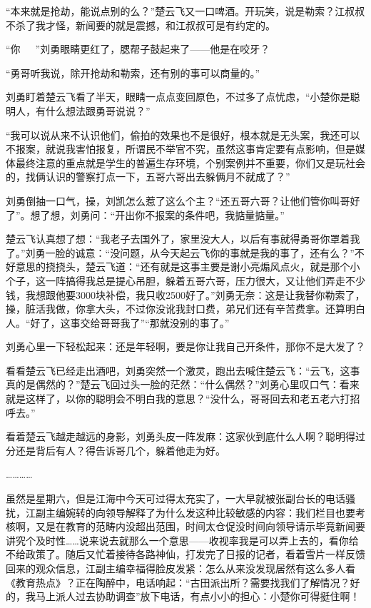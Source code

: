“本来就是抢劫，能说点别的么？”楚云飞又一口啤酒。开玩笑，说是勒索？江叔叔不杀了我才怪，新闻要的就是震撼，和江叔叔可是有约定的。

“你~~~”刘勇眼睛更红了，腮帮子鼓起来了——他是在咬牙？

“勇哥听我说，除开抢劫和勒索，还有别的事可以商量的。”

刘勇盯着楚云飞看了半天，眼睛一点点变回原色，不过多了点忧虑，“小楚你是聪明人，有什么想法跟勇哥说说？”

“我可以说从来不认识他们，偷拍的效果也不是很好，根本就是无头案，我还可以不报案，就说我害怕报复，所谓民不举官不究，虽然这事肯定要有点影响，但是媒体最终注意的重点就是学生的普遍生存环境，个别案例并不重要，你们又是玩社会的，找俩认识的警察打点一下，五哥六哥出去躲俩月不就成了？”

刘勇倒抽一口气，操，刘凯怎么惹了这么个主？“还五哥六哥？让他们管你叫哥好了”。想了想，刘勇问：“开出你不报案的条件吧，我掂量掂量。”

楚云飞认真想了想：“我老子去国外了，家里没大人，以后有事就得勇哥你罩着我了。”刘勇一脸的诚意：“没问题，从今天起云飞你的事就是我的事了，还有么？”不好意思的挠挠头，楚云飞道：“还有就是这事主要是谢小亮煽风点火，就是那个小个子，这一阵搞得我总是提心吊胆，躲着五哥六哥，压力很大，又让他们弄走不少钱，我想跟他要3000块补偿，我只收2500好了。”刘勇无奈：这是让我替你勒索了，操，脏活我做，你拿大头，不过你没讹我封口费，弟兄们还有辛苦费拿。还算明白人。“好了，这事交给哥哥我了”“那就没别的事了。”

刘勇心里一下轻松起来：还是年轻啊，要是你让我自己开条件，那你不是大发了？

看看楚云飞已经走出酒吧，刘勇突然一个激灵，跑出去喊住楚云飞：“云飞，这事真的是偶然的？”楚云飞回过头一脸的茫然：“什么偶然？”刘勇心里叹口气：看来就是这样了，以你的聪明会不明白我的意思？“没什么，哥哥回去和老五老六打招呼去。”

看着楚云飞越走越远的身影，刘勇头皮一阵发麻：这家伙到底什么人啊？聪明得过分还是背后有人？得告诉哥几个，躲着他走为好。

…………

虽然是星期六，但是江海中今天可过得太充实了，一大早就被张副台长的电话骚扰，江副主编婉转的向领导解释了为什么发这种比较敏感的内容：我们栏目也要考核啊，又是在教育的范畴内没超出范围，时间太仓促没时间向领导请示毕竟新闻要讲究个及时性……说来说去就那么一个意思——收视率我是可以弄上去的，看你给不给政策了。随后又忙着接待各路神仙，打发完了日报的记者，看着雪片一样反馈回来的观众信息，江副主编幸福得脸皮发紧：怎么从来没发现居然有这么多人看《教育热点》？正在陶醉中，电话响起：“古田派出所？需要找我们了解情况？好的，我马上派人过去协助调查”放下电话，有点小小的担心：小楚你可得挺住啊！

